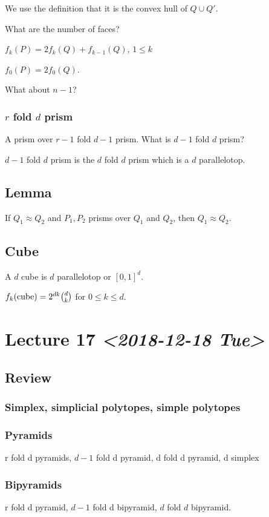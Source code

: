 \documentclass[11pt]{article}
\begin{document}
{{We use the definition that it is the convex hull of \(Q \cup Q'\).

What are the number of faces?

\(f_k(P) = 2f_k(Q) + f_{k-1}(Q)\), \(1 \le k\)

\(f_0(P) = 2f_0(Q)\).

What about \(n-1\)?
\subsubsection{\(r\) fold \(d\) prism}
\label{sec:org424e282}
A prism over \(r-1\) fold \(d-1\) prism. What is \(d-1\) fold \(d\) prism?

\(d-1\) fold \(d\) prism is the \(d\) fold \(d\) prism which is a \(d\) parallelotop.
\subsection{Lemma}
\label{sec:org07cc82a}
If \(Q_1 \approx Q_2\) and \(P_1, P_2\) prisms over \(Q_1\) and \(Q_2\), then \(Q_1
   \approx Q_2\).
\subsection{Cube}
\label{sec:org6bdc1d8}
A \(d\) cube is \(d\) parallelotop or \([0,1]^d\).

\(f_k(\textup{cube}) = 2^{dk} \binom{d}{k}\) for \(0 \le k \le d\).
\section{Lecture 17 \textit{<2018-12-18 Tue>}}
\label{sec:orgc7cd2db}
\subsection{Review}
\label{sec:org1f4006f}
\subsubsection{Simplex, simplicial polytopes, simple polytopes}
\label{sec:org76999d9}
\subsubsection{Pyramids}
\label{sec:org3d1ef41}
r fold d pyramids, \(d-1\) fold d pyramid, d fold d pyramid, d simplex
\subsubsection{Bipyramids}
\label{sec:org9ec6395}
r fold d pyramid, \(d-1\) fold d bipyramid, \(d\) fold \(d\) bipyramid.

}}
\end{document}
